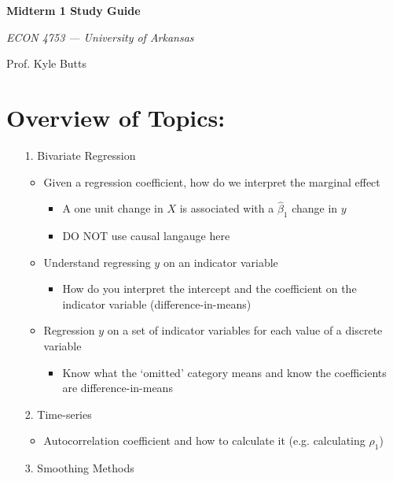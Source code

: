 \documentclass[12pt]{article}
\begin{document}
\begin{center}
  {\Huge\bf Midterm 1 Study Guide}
  
  \smallskip
  {\large\it ECON 4753 — University of Arkansas}

  \medskip
  {\large Prof. Kyle Butts}
\end{center}

\section*{Overview of Topics:}
\begin{enumerate}
  
  \item[1.] Bivariate Regression
  \begin{itemize}    
    \item Given a regression coefficient, how do we interpret the marginal effect
    \begin{itemize}
      \item A one unit change in $X$ is associated with a $\hat{\beta}_1$ change in $y$
      \item DO NOT use causal langauge here
    \end{itemize}

    \item Understand regressing $y$ on an indicator variable
    \begin{itemize}
      \item How do you interpret the intercept and the coefficient on the indicator variable (difference-in-means)
    \end{itemize}

    \item Regression $y$ on a set of indicator variables for each value of a discrete variable
    \begin{itemize}
      \item Know what the `omitted' category means and know the coefficients are difference-in-means
    \end{itemize}
  \end{itemize}
  
  \item[2.] Time-series
  \begin{itemize}
    \item Autocorrelation coefficient and how to calculate it (e.g. calculating $\rho_1$)
  \end{itemize}

  \item[3.] Smoothing Methods
  

\end{enumerate}
\end{document}

